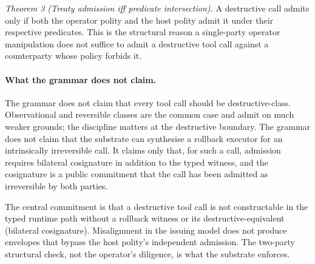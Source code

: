 \emph{Theorem 3 (Treaty admission iff predicate intersection).} A destructive call admits only if both the operator polity and the host polity admit it under their respective predicates. This is the structural reason a single-party operator manipulation does not suffice to admit a destructive tool call against a counterparty whose policy forbids it.

\paragraph{What the grammar does not claim.}
The grammar does not claim that every tool call should be destructive-class. Observational and reversible classes are the common case and admit on much weaker grounds; the discipline matters at the destructive boundary. The grammar does not claim that the substrate can synthesise a rollback executor for an intrinsically irreversible call. It claims only that, for such a call, admission requires bilateral cosignature in addition to the typed witness, and the cosignature is a public commitment that the call has been admitted as irreversible by both parties.

The central commitment is that a destructive tool call is not constructable in the typed runtime path without a rollback witness or its destructive-equivalent (bilateral cosignature). Misalignment in the issuing model does not produce envelopes that bypass the host polity's independent admission. The two-party structural check, not the operator's diligence, is what the substrate enforces.
